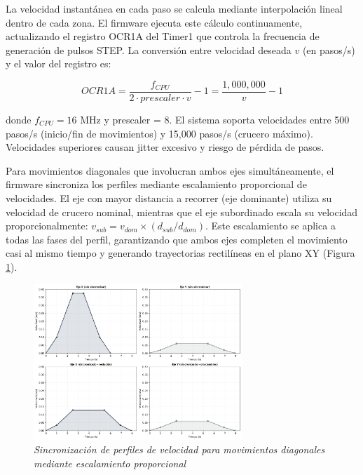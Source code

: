 La velocidad instantánea en cada paso se calcula mediante interpolación lineal dentro de cada zona. El firmware ejecuta este cálculo continuamente, actualizando el registro OCR1A del Timer1 que controla la frecuencia de generación de pulsos STEP. La conversión entre velocidad deseada $v$ (en pasos/s) y el valor del registro es:

\begin{equation}
OCR1A = \frac{f_{CPU}}{2 \cdot prescaler \cdot v} - 1 = \frac{1,000,000}{v} - 1
\end{equation}

donde $f_{CPU} = 16$ MHz y prescaler = 8. El sistema soporta velocidades entre 500 pasos/s (inicio/fin de movimientos) y 15,000 pasos/s (crucero máximo). Velocidades superiores causan jitter excesivo y riesgo de pérdida de pasos.

Para movimientos diagonales que involucran ambos ejes simultáneamente, el firmware sincroniza los perfiles mediante escalamiento proporcional de velocidades. El eje con mayor distancia a recorrer (eje dominante) utiliza su velocidad de crucero nominal, mientras que el eje subordinado escala su velocidad proporcionalmente: $v_{sub} = v_{dom} \times (d_{sub}/d_{dom})$. Este escalamiento se aplica a todas las fases del perfil, garantizando que ambos ejes completen el movimiento casi al mismo tiempo y generando trayectorias rectilíneas en el plano XY (Figura \ref{fig:sincronizacion_multieje}).

\begin{figure}[H]
    \centering
    \includegraphics[width=0.7\textwidth]{imagenes/sincronizacion_multieje.png}
    \caption{\textit{Sincronización de perfiles de velocidad para movimientos diagonales mediante escalamiento proporcional}}
    \label{fig:sincronizacion_multieje}
\end{figure}
